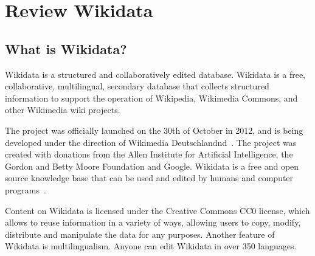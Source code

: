 \setchapterpreamble[u]{\margintoc}
\chapter{Review Wikidata}


\section{What is Wikidata?}
Wikidata is a structured and collaboratively edited database. Wikidata is a free, collaborative, multilingual, secondary database that collects structured information to support the operation of Wikipedia, Wikimedia Commons, and other Wikimedia wiki projects. 

The project was officially launched on the 30th of October in 2012, and is being developed under the direction of Wikimedia Deutschlandnd~. The project was created with donations from the Allen Institute for Artificial Intelligence, the Gordon and Betty Moore Foundation and Google. Wikidata is a free and open source knowledge base that can be used and edited by humans and computer programs~.

Content on Wikidata is licensed under the Creative Commons CC0 license, which allows to reuse information in a variety of ways, allowing users to copy, modify, distribute and manipulate the data for any purposes. Another feature of Wikidata is multilingualism. Anyone can edit Wikidata in over 350 languages.

